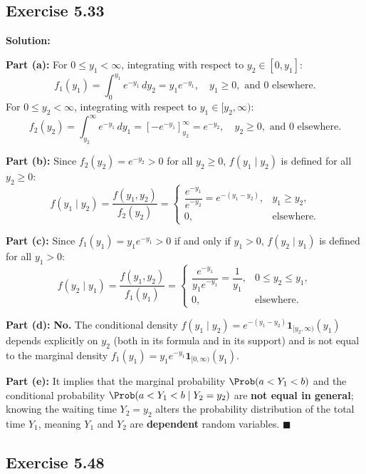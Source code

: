 \documentclass[11pt, letterpaper]{article}
\begin{document}
\subsection{Exercise 5.33}

\textbf{Solution:}

\textbf{Part (a):} For $0 \le y_1 < \infty$, integrating with respect to $y_2 \in [0, y_1]$:
\[ f_1(y_1) = \int_0^{y_1} e^{-y_1} \, dy_2 = y_1 e^{-y_1}, \quad y_1 \ge 0, \text{ and } 0 \text{ elsewhere.} \]
For $0 \le y_2 < \infty$, integrating with respect to $y_1 \in [y_2, \infty)$:
\[ f_2(y_2) = \int_{y_2}^\infty e^{-y_1} \, dy_1 = \left[ -e^{-y_1} \right]_{y_2}^\infty = e^{-y_2}, \quad y_2 \ge 0, \text{ and } 0 \text{ elsewhere.} \]

\textbf{Part (b):} Since $f_2(y_2) = e^{-y_2} > 0$ for all $y_2 \ge 0$, $f(y_1 \mid y_2)$ is defined for all $y_2 \ge 0$:
\[ f(y_1 \mid y_2) = \frac{f(y_1, y_2)}{f_2(y_2)} = \begin{cases} \dfrac{e^{-y_1}}{e^{-y_2}} = e^{-(y_1 - y_2)}, & y_1 \ge y_2, \\ 0, & \text{elsewhere.} \end{cases} \]

\textbf{Part (c):} Since $f_1(y_1) = y_1 e^{-y_1} > 0$ if and only if $y_1 > 0$, $f(y_2 \mid y_1)$ is defined for all $y_1 > 0$:
\[ f(y_2 \mid y_1) = \frac{f(y_1, y_2)}{f_1(y_1)} = \begin{cases} \dfrac{e^{-y_1}}{y_1 e^{-y_1}} = \dfrac{1}{y_1}, & 0 \le y_2 \le y_1, \\ 0, & \text{elsewhere.} \end{cases} \]

\textbf{Part (d):} \textbf{No.} The conditional density $f(y_1 \mid y_2) = e^{-(y_1 - y_2)} \mathbf{1}_{[y_2, \infty)}(y_1)$ depends explicitly on $y_2$ (both in its formula and in its support) and is not equal to the marginal density $f_1(y_1) = y_1 e^{-y_1} \mathbf{1}_{[0, \infty)}(y_1)$.

\textbf{Part (e):} It implies that the marginal probability $\Prob(a < Y_1 < b)$ and the conditional probability $\Prob(a < Y_1 < b \mid Y_2 = y_2)$ are \textbf{not equal in general}; knowing the waiting time $Y_2 = y_2$ alters the probability distribution of the total time $Y_1$, meaning $Y_1$ and $Y_2$ are \textbf{dependent} random variables. $\blacksquare$

\subsection{Exercise 5.48}
\end{document}

